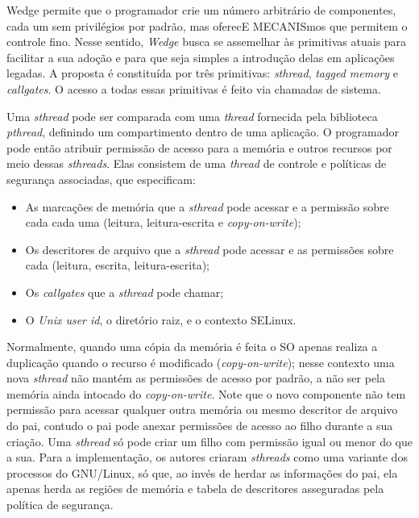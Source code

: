 Wedge permite que o programador crie um número arbitrário de
componentes, cada um sem privilégios por padrão, mas oferecE MECANISmos que
permitem o controle fino. Nesse sentido, \emph{Wedge} busca se assemelhar às
primitivas atuais para facilitar a sua adoção e para que seja simples a
introdução delas em aplicações legadas. A proposta é constituída por três
primitivas: \emph{sthread}, \emph{tagged memory} e \emph{callgates}. O
acesso a todas essas primitivas é feito via chamadas de sistema.

Uma \emph{sthread} pode ser comparada com uma \emph{thread} fornecida pela biblioteca
\textit{pthread}, definindo um compartimento dentro de uma
aplicação. O programador pode então atribuir permissão de acesso para a memória
e outros recursos por meio dessas \emph{sthreads}. Elas consistem de uma
\emph{thread} de controle e políticas de segurança associadas, que especificam:

\begin{itemize}
	\item As marcações de memória que a \emph{sthread} pode acessar e a permissão
				sobre cada cada uma (leitura, leitura-escrita e \textit{copy-on-write});
	\item Os descritores de arquivo que a \emph{sthread} pode acessar e as
				permissões sobre cada (leitura, escrita, leitura-escrita);
	\item Os \emph{callgates} que a \emph{sthread} pode chamar;
	\item O \emph{Unix user id}, o diretório raiz, e o contexto SELinux.
\end{itemize}

Normalmente, quando uma cópia da memória é feita o SO apenas realiza a
duplicação quando o recurso é modificado (\emph{copy-on-write}); nesse contexto
uma nova \emph{sthread} não mantém as permissões de acesso por padrão, a não
ser pela memória ainda intocado do \emph{copy-on-write}. Note que o novo
componente não tem permissão para acessar qualquer outra memória ou mesmo
descritor de arquivo do pai, contudo o pai pode anexar permissões de acesso ao
filho durante a sua criação. Uma \emph{sthread} só pode criar um filho com
permissão igual ou menor do que a sua. Para a implementação, os autores criaram
\emph{sthreads} como uma variante dos processos do GNU/Linux, só que, ao invés
de herdar as informações do pai, ela apenas herda as regiões de memória e
tabela de descritores asseguradas pela política de segurança.

